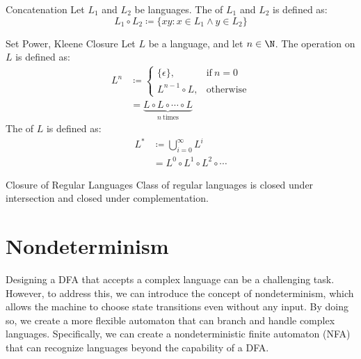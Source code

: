 \documentclass[12pt]{report}
\begin{document}
\begin{dfnbox}{Concatenation}{}
    Let $L_1$ and $L_2$ be languages. The  of $L_1$ and $L_2$ is defined as:
    \[ L_1 \circ L_2 \coloneq \{ xy : x \in L_1 \land y \in L_2 \} \]
\end{dfnbox}

\begin{dfnbox}{Set Power, Kleene Closure}{}
    Let $L$ be a language, and let $n \in \N$. The  operation on $L$ is defined as:
    \begin{align*}
        L^n &\coloneq \begin{cases}
            \{\epsilon\}, & \text{if}\ n = 0  \\
            L^{n-1} \circ L, & \text{otherwise}
        \end{cases} \\
        &= \underbrace{L \circ L \circ \cdots \circ L}_{n\ \text{times}}
    \end{align*}
    The  of $L$ is defined as:
    \begin{align*}
        L^* &\coloneq \bigcup_{i = 0}^\infty L^i \\
        &= L^0 \circ L^1 \circ L^2 \circ \cdots
    \end{align*}
\end{dfnbox}

\begin{thmbox}{Closure of Regular Languages}{}
    Class of regular languages is closed under intersection and closed under complementation.
\end{thmbox}

\section{Nondeterminism}

Designing a DFA that accepts a complex language can be a challenging task. However, to address this, we can introduce the concept of nondeterminism, which allows the machine to choose state transitions even without any input. By doing so, we create a more flexible automaton that can branch and handle complex languages. Specifically, we can create a nondeterministic finite automaton (NFA) that can recognize languages beyond the capability of a DFA.

\end{document}
